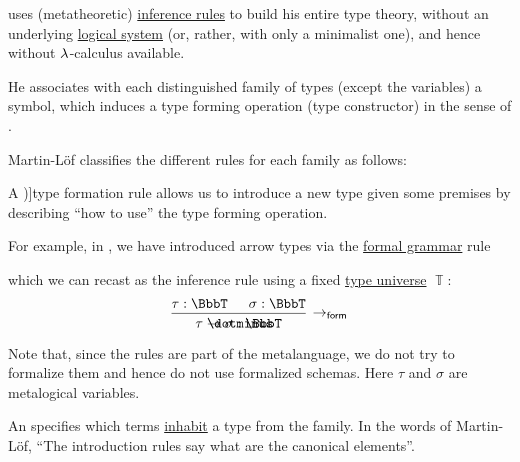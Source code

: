 \begin{remark}\label{rem:type_theory_rule_classification}
   uses (metatheoretic) \hyperref[def:inference_rule]{inference rules} to build his entire type theory, without an underlying \hyperref[con:logical_system]{logical system} (or, rather, with only a minimalist one), and hence without \( {\mathrm \lambda} \)-calculus available.

  He associates with each distinguished family of types (except the variables) a symbol, which induces a type forming operation (type constructor) in the sense of .

  Martin-L\"of classifies the different rules for each family as follows:
  \begin{thmenum}
     A \term[en=formation (rule) (\cite[\S 8.1.9]{Mimram2020ProgramEqualsProof})]{type formation} rule allows us to introduce a new type given some premises by describing \enquote{how to use} the type forming operation.

    For example, in , we have introduced arrow types via the \hyperref[def:formal_grammar/schema]{formal grammar} rule
    \begin{bnf*}
       {\bnftsq{(} \bnfsp {} \bnfsp \bnftsq{\( \synimplies \)} \bnfsp {} \bnfsp \bnftsq{)}}
    \end{bnf*}
    which we can recast as the inference rule using a fixed \hyperref[con:type_universe]{type universe} \( \BbbT \):
    \begin{equation*}
      \begin{prooftree}
        \hypo{ \tau: \BbbT }
        \hypo{ \sigma: \BbbT }
        \infer2[\ensuremath{ \rightarrow_{\logic{form}} }]{ \tau \synimplies \sigma: \BbbT }
      \end{prooftree}
    \end{equation*}

    Note that, since the rules are part of the metalanguage, we do not try to formalize them and hence do not use formalized schemas. Here \( \tau \) and \( \sigma \) are metalogical variables.

     An  specifies which terms \hyperref[def:type_habitation]{inhabit} a type from the family. In the words of Martin-L\"of, \enquote{The introduction rules say what are the canonical elements}.


\end{thmenum}
\end{remark}
